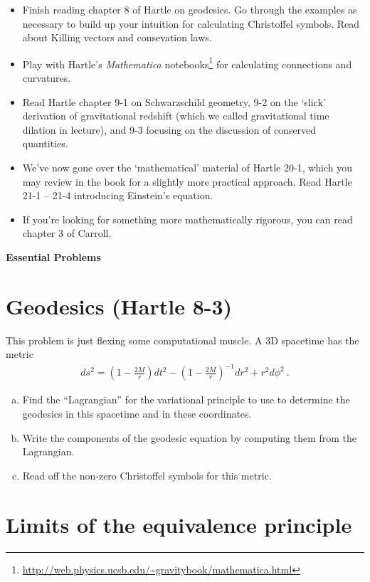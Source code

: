 \documentclass[12pt]{article}
\numberwithin{equation}{section}    %
\begin{document}
\begin{itemize}
	\item Finish reading chapter 8 of Hartle on geodesics. Go through the examples as necessary to build up your intuition for calculating Christoffel symbols. Read about Killing vectors and consevation laws. 
	\item Play with Hartle's \emph{Mathematica} notebooks\footnote{\url{http://web.physics.ucsb.edu/~gravitybook/mathematica.html}} for calculating connections and curvatures.
	\item Read Hartle chapter 9-1 on Schwarzschild geometry, 9-2 on the `slick' derivation of gravitational redshift (which we called gravitational time dilation in lecture), and 9-3 focusing on the discussion of conserved quantities. 
	\item We've now gone over the `mathematical' material of Hartle 20-1, which you may review in the book for a slightly more practical approach. Read Hartle 21-1 -- 21-4 introducing Einstein's equation. 
	\item If you're looking for something more mathematically rigorous, you can read chapter 3 of Carroll. 
\end{itemize}


\vspace{2em}
{\Large\textbf{\textsf{Essential Problems}}}

\section{Geodesics (Hartle 8-3)}

This problem is just flexing some computational muscle. A 3D spacetime has the metric
\begin{align}
	ds^2 = \left(1-\frac{2M}{r}\right) dt^2 
	- \left(1-\frac{2M}{r}\right)^{-1} dr^2
	+ r^2 d\phi^2 \ .
\end{align}
\begin{enumerate}[(a)]
	\item Find the ``Lagrangian'' for the variational principle to use to determine the geodesics in this spacetime and in these coordinates.
	\item Write the components of the geodesic equation by computing them from the Lagrangian. 
	\item Read off the non-zero Christoffel symbols for this metric.
\end{enumerate}

\section{Limits of the equivalence principle}
\end{document}
